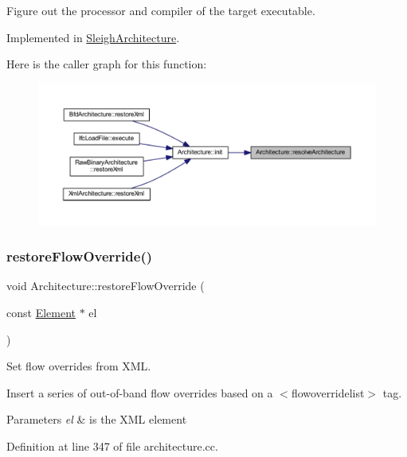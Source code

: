 Figure out the processor and compiler of the target executable. 



Implemented in \mbox{\hyperlink{class_sleigh_architecture_a937a743a8538c2cbfdb40926cd7bc7f8}{Sleigh\+Architecture}}.

Here is the caller graph for this function\+:
\nopagebreak
\begin{figure}[H]
\begin{center}
\leavevmode
\includegraphics[width=350pt]{class_architecture_aea7d061dab582340c8e9bb3323abdf4a_icgraph}
\end{center}
\end{figure}
\mbox{\label{class_architecture_a4181297a704049ca50c3fc3d233bc0e4}} 
\subsubsection{\texorpdfstring{restoreFlowOverride()}{restoreFlowOverride()}}
{\footnotesize\ttfamily void Architecture\+::restore\+Flow\+Override (\begin{DoxyParamCaption}\item[{const \mbox{\hyperlink{class_element}{Element}} $\ast$}]{el }\end{DoxyParamCaption})}



Set flow overrides from X\+ML. 

Insert a series of out-\/of-\/band flow overrides based on a $<$flowoverridelist$>$ tag. 
\begin{DoxyParams}{Parameters}
{\em el} & is the X\+ML element \\
\hline
\end{DoxyParams}


Definition at line 347 of file architecture.\+cc.

